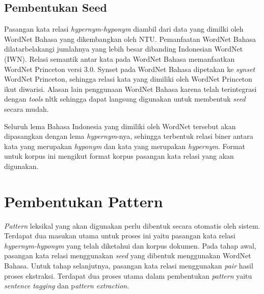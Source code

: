 \subsection{Pembentukan Seed}
Pasangan kata relasi \textit{hypernym-hyponym} diambil dari data yang dimilki oleh WordNet Bahasa yang dikembangkan oleh NTU. Pemanfaatan WordNet Bahasa dilatarbelakangi jumlahnya yang lebih besar dibanding Indonesian WordNet (IWN). Relasi semantik antar kata pada WordNet Bahasa memanfaatkan WordNet Princeton versi 3.0. Synset pada WordNet Bahasa dipetakan ke \textit{synset} WordNet Princeton, sehingga relasi kata yang dimiliki oleh WordNet Princeton ikut diwarisi. Alasan lain penggunaan WordNet Bahasa karena telah terintegrasi dengan \textit{tools} nltk sehingga dapat langsung digunakan untuk membentuk \textit{seed} secara mudah.

Seluruh lema Bahasa Indonesia yang dimiliki oleh WordNet tersebut akan dipasangkan dengan lema \textit{hypernym}-nya, sehingga terbentuk relasi biner antara kata yang merupakan \textit{hyponym} dan kata yang merupakan \textit{hypernym}. Format untuk korpus ini mengikut format korpus pasangan kata relasi yang akan digunakan.


\section{Pembentukan Pattern}
\textit{Pattern} leksikal yang akan digunakan perlu dibentuk secara otomatis oleh sistem. Terdapat dua masukan utama untuk proses ini yaitu pasangan kata relasi \textit{hypernym-hyponym} yang telah diketahui dan korpus dokumen. Pada tahap awal, pasangan kata relasi menggunakan \textit{seed} yang dibentuk menggunakan WordNet Bahasa. Untuk tahap selanjutnya, pasangan kata relasi menggunakan \textit{pair} hasil proses ekstraksi. Terdapat dua proses utama dalam pembentukan \textit{pattern} yaitu \textit{sentence tagging} dan p\textit{attern extraction}.

